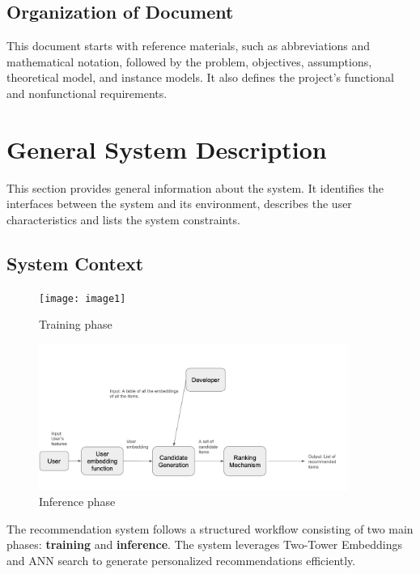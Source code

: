 \documentclass[12pt]{article}
\begin{document}
\subsection{Organization of Document}

This document starts with reference materials, such as abbreviations and mathematical notation, followed by the problem, objectives, assumptions, theoretical model, and instance models. It also defines the project's functional and nonfunctional requirements.

\section{General System Description}

This section provides general information about the system.  It identifies the
interfaces between the system and its environment, describes the user
characteristics and lists the system constraints. 

\subsection{System Context}

\begin{figure}[h!]
\begin{center}
 \texttt{[image: image1]}
\caption{Training phase}
\label{Fig_SystemContext1} 
\end{center}

\end{figure}
\begin{figure}[h!]
  \begin{center}
   \includegraphics[width=0.9\textwidth]{image2}
  \caption{Inference phase}
  \label{Fig_SystemContext2} 
  \end{center}
  \end{figure}
The recommendation system follows a structured workflow consisting of two main phases: \textbf{training} and \textbf{inference}. The system leverages Two-Tower Embeddings and ANN search to generate personalized recommendations efficiently.
\end{document}
